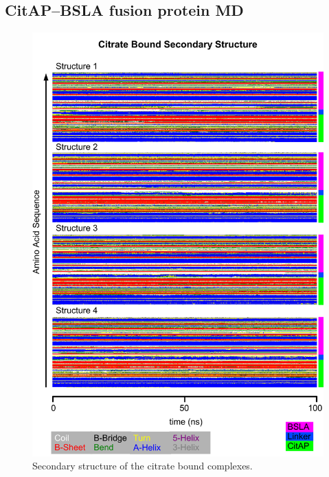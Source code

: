 \documentclass[english, a4paper, 12pt, titlepage, draft]{article}
\begin{document}
\subsection{CitAP--BSLA fusion protein MD}




\begin{figure}
    \centering
    \includegraphics[width=1.0\textwidth]{figures/DSSP/dssp_bound.pdf}
    \caption{Secondary structure of the citrate bound complexes.}
    \label{fig:DSSP_bound}
\end{figure}          
\end{document}

